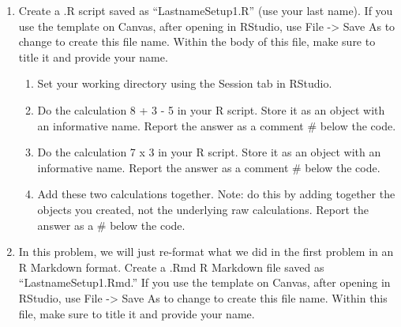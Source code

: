 \documentclass[
  letterpaper,
  DIV=11,
  numbers=noendperiod]{scrreprt}
\providecommand{\tightlist}{%
  \setlength{\itemsep}{0pt}\setlength{\parskip}{0pt}}\usepackage{longtable,booktabs,array}
\begin{document}
\begin{enumerate}
\def\labelenumi{\arabic{enumi}.}
\tightlist
\item
  Create a .R script saved as ``LastnameSetup1.R'' (use your last name).
  If you use the template on Canvas, after opening in RStudio, use File
  -\textgreater{} Save As to change to create this file name. Within the
  body of this file, make sure to title it and provide your name.

  \begin{enumerate}
  \def\labelenumii{\arabic{enumii}.}
  \tightlist
  \item
    Set your working directory using the Session tab in RStudio.
  \item
    Do the calculation 8 + 3 - 5 in your R script. Store it as an object
    with an informative name. Report the answer as a comment \# below
    the code.
  \item
    Do the calculation 7 x 3 in your R script. Store it as an object
    with an informative name. Report the answer as a comment \# below
    the code.
  \item
    Add these two calculations together. Note: do this by adding
    together the objects you created, not the underlying raw
    calculations. Report the answer as a \# below the code.
  \end{enumerate}
\item
  In this problem, we will just re-format what we did in the first
  problem in an R Markdown format. Create a .Rmd R Markdown file saved
  as ``LastnameSetup1.Rmd.'' If you use the template on Canvas, after
  opening in RStudio, use File -\textgreater{} Save As to change to
  create this file name. Within this file, make sure to title it and
  provide your name.


\end{enumerate}
\end{document}
